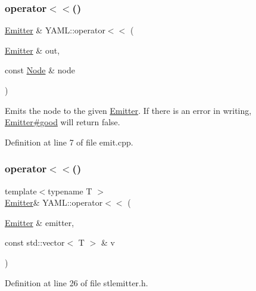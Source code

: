 \subsubsection{\texorpdfstring{operator$<$$<$()}{operator<<()}\hspace{0.1cm}{\footnotesize\ttfamily [2/35]}}
{\footnotesize\ttfamily \mbox{\hyperlink{class_y_a_m_l_1_1_emitter}{Emitter}} \& Y\+A\+M\+L\+::operator$<$$<$ (\begin{DoxyParamCaption}\item[{\mbox{\hyperlink{class_y_a_m_l_1_1_emitter}{Emitter}} \&}]{out,  }\item[{const \mbox{\hyperlink{class_y_a_m_l_1_1_node}{Node}} \&}]{node }\end{DoxyParamCaption})}

Emits the node to the given \mbox{\hyperlink{class_y_a_m_l_1_1_emitter}{Emitter}}. If there is an error in writing, \mbox{\hyperlink{class_y_a_m_l_1_1_emitter_a3a0c449843c5fda5d1e6faae188debcb}{Emitter\#good}} will return false. 

Definition at line 7 of file emit.\+cpp.

\mbox{\label{namespace_y_a_m_l_ad51cdb0606a48c3d2d8587cbbb7d5fef}} 
\subsubsection{\texorpdfstring{operator$<$$<$()}{operator<<()}\hspace{0.1cm}{\footnotesize\ttfamily [3/35]}}
{\footnotesize\ttfamily template$<$typename T $>$ \\
\mbox{\hyperlink{class_y_a_m_l_1_1_emitter}{Emitter}}\& Y\+A\+M\+L\+::operator$<$$<$ (\begin{DoxyParamCaption}\item[{\mbox{\hyperlink{class_y_a_m_l_1_1_emitter}{Emitter}} \&}]{emitter,  }\item[{const std\+::vector$<$ T $>$ \&}]{v }\end{DoxyParamCaption})\hspace{0.3cm}{\ttfamily [inline]}}



Definition at line 26 of file stlemitter.\+h.

\mbox{\label{namespace_y_a_m_l_a909957d407397c8d5b761db30ebcfe93}} 
